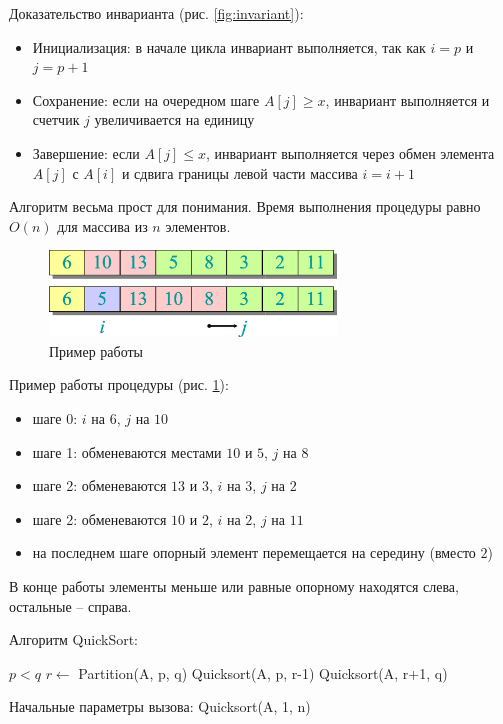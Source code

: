 \documentclass[11pt]{article}
\begin{document}
Доказательство инварианта (рис. \ref{fig:invariant}):
\nopagebreak
\begin{itemize}
\item Инициализация: в начале цикла инвариант выполняется, так как $i = p$ и $j = p+1$ 
\item Сохранение: если на очередном шаге $A[j] \geqslant x$, инвариант выполняется и счетчик $j$ увеличивается на единицу
\item Завершение: если $A[j] \leqslant x$, инвариант выполняется через обмен элемента $A[j]$ с $A[i]$ и сдвига границы левой части массива $i = i+1$
\end{itemize}

Алгоритм весьма прост для понимания. Время выполнения процедуры равно $O(n)$ для массива из $n$ элементов.

\begin{figure}[ht]
  \centering
  \includegraphics[width=3in]{lecture4/example1.eps}
  \caption{Пример работы}
  \label{fig:example1}
\end{figure}

Пример работы процедуры (рис. \ref{fig:example1}):
\begin{itemize}
\item шаге 0: $i$ на $6$, $j$ на $10$
\item шаге 1: обменеваются местами $10$ и $5$, $j$ на $8$
\item шаге 2: обменеваются $13$ и $3$, $i$ на $3$, $j$ на $2$
\item шаге 2: обменеваются $10$ и $2$, $i$ на $2$, $j$ на $11$
\item на последнем шаге опорный элемент перемещается на середину (вместо $2$) 
\end{itemize}
В конце работы элементы меньше или равные опорному находятся слева, остальные -- справа.

Алгоритм QuickSort:
\nopagebreak
\begin{codebox}
\li	\If $p < q$
\li		\Then $r \gets $ Partition(A, p, q)
\li			Quicksort(A, p, r-1)
\li			Quicksort(A, r+1, q)
	\End
\End
\end{codebox}

Начальные параметры вызова: Quicksort(A, 1, n)
\end{document}
